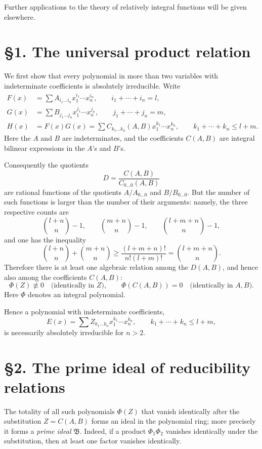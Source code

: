 \documentclass[11pt]{article}
\begin{document}
Further applications to the theory of relatively integral functions will be given elsewhere.

\section*{\S 1. The universal product relation}

We first show that every polynomial in more than two variables with indeterminate coefficients is absolutely irreducible. Write
\begin{align}
F(x) &= \sum A_{i_1\dots i_n}x_1^{i_1}\cdots x_n^{i_n}, \qquad i_1+\cdots+i_n=l, \tag{0.1}\\
G(x) &= \sum B_{j_1\dots j_n}x_1^{j_1}\cdots x_n^{j_n}, \qquad j_1+\cdots+j_n=m, \tag{0.2}\\
H(x) &= F(x)G(x)=\sum C_{k_1\dots k_n}(A,B)x_1^{k_1}\cdots x_n^{k_n},
\qquad k_1+\cdots+k_n\le l+m. \tag{0.3}
\end{align}
Here the $A$ and $B$ are indeterminates, and the coefficients $C(A,B)$ are integral bilinear expressions in the $A$'s and $B$'s.

Consequently the quotients
\[
D = \frac{C(A,B)}{C_{0\dots 0}(A,B)}
\]
are rational functions of the quotients $A/A_{0\dots 0}$ and $B/B_{0\dots 0}$. But the number of such functions is larger than the number of their arguments: namely, the three respective counts are
\[
\binom{l+n}{n}-1,\qquad \binom{m+n}{n}-1,
\qquad \binom{l+m+n}{n}-1,
\]
and one has the inequality
\[
\binom{l+n}{n}+\binom{m+n}{n}
\ge \frac{(l+m+n)!}{n!(l+m)!}
= \binom{l+m+n}{n}.
\]
Therefore there is at least one algebraic relation among the $D(A,B)$, and hence also among the coefficients $C(A,B)$:
\[
\Phi(Z)\not\equiv 0 \quad \text{(identically in $Z$)},
\qquad \Phi(C(A,B))=0 \quad \text{(identically in $A,B$)}.
\tag{0.4}
\]
Here $\Phi$ denotes an integral polynomial.

Hence a polynomial with indeterminate coefficients,
\[
E(x)=\sum Z_{k_1\dots k_n}x_1^{k_1}\cdots x_n^{k_n},
\qquad k_1+\cdots+k_n\le l+m,
\tag{0.5}
\]
is necessarily absolutely irreducible for $n>2$.

\section*{\S 2. The prime ideal of reducibility relations}

The totality of all such polynomials $\Phi(Z)$ that vanish identically after the substitution $Z=C(A,B)$ forms an ideal in the polynomial ring; more precisely it forms a \emph{prime ideal} $\mathfrak B$. Indeed, if a product $\Phi_1\Phi_2$ vanishes identically under the substitution, then at least one factor vanishes identically.
\end{document}
